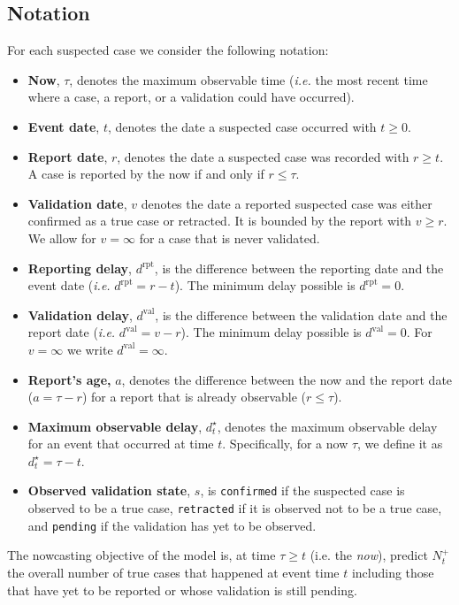 \documentclass{article}
\theoremstyle{definition}
\theoremstyle{remark}
\begin{document}
\subsection{Notation}
For each suspected case we consider the following notation:
\begin{itemize}
    \item \textbf{Now}, $\tau$, denotes the maximum observable time (\textit{i.e.} the most recent time where a case, a report, or a validation could have occurred). 
    \item \textbf{Event date}, $t$, denotes the date a suspected case occurred with $t \geq 0$. 
    \item \textbf{Report date}, $r$, denotes the date a suspected case was recorded with $r \geq t$. A case is reported by the now if and only if $r \leq \tau$. 
    \item \textbf{Validation date}, $v$ denotes the date a reported suspected case was either confirmed as a true case or retracted. It is bounded by the report with $v \geq r$. We allow for $v = \infty$ for a case that is never validated.   
    \item \textbf{Reporting delay}, $d^{\text{rpt}}$, is the difference between the reporting date and the event date (\textit{i.e.} $d^{\text{rpt}} = r - t$). The minimum delay possible is $d^{\text{rpt}} = 0$. 
    \item \textbf{Validation delay}, $d^{\text{val}}$, is the difference between the validation date and the report date (\textit{i.e.} $d^{\text{val}} = v - r$). The minimum delay possible is $d^{\text{val}} = 0$. For $v = \infty$ we write $d^{\text{val}} = \infty$.
    \item \textbf{Report's age,} $a$, denotes the difference between the now and the report date ($a = \tau - r$) for a report that is already observable ($r \leq \tau$).   
    \item \textbf{Maximum observable delay}, $d^{\star}_t$, denotes the maximum observable delay for an event that occurred at time $t$. Specifically, for a now $\tau$, we define it as $d^{\star}_t = \tau - t$.
    \item \textbf{Observed validation state}, $s$, is \texttt{confirmed} if the suspected case is observed to be a true case, \texttt{retracted} if it is observed not to be a true case, and \texttt{pending} if the validation has yet to be observed.
\end{itemize}
The nowcasting objective of the model is, at time $\tau \geq t$ (i.e. the \textit{now}), predict $N_t^+$ the overall number of true cases that happened at event time $t$ including those that have yet to be reported or whose validation is still pending. 
\end{document}
